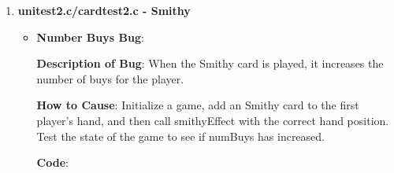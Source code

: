 \documentclass[11pt,letterpaper]{article}
\begin{document}
\begin{enumerate}[label=\Roman*.]
\begin{enumerate}
\begin{itemize}[leftmargin=*]
        \item \textbf{Discard Count Bug}:

          \textbf{Description of Bug}: The discard count increase does not match the number of 
          non-treasures drawn from deck. This bug is only detectable when (1) there are non-treasures
          in the deck before the second treasure and (2) there are at least two treasures in 
          the deck. 

        \textbf{How to Cause}: Initialize a game, add an adventurer card to the first player's hand, 
            add two treasures to the deck followed by two non-treasures. Check to see if discard pile has increased by 2.

        \textbf{Code}:
          \begin{lstlisting}

 ...<initialization same as above>... 
  if (testG.discardCount[player] == G.discardCount[player] + 2) {
    int first = testG.discard[player][testG.discardCount[player] - 1];
    int second = testG.discard[player][testG.discardCount[player] - 2];

    if ((first == duchy) && (second == province))
      printf("\tPASSED: Discarded cards match non-treasures drawn from deck\n");
    else
      printf("\t\u274CFAILED: Discarded cards do not match non-treasures drawn from deck\n");
  }
  else printf("\t\u274CFAILED: Discard should have increased by 2, but instead increased by %d\n", testG.discardCount[player] - G.discardCount[player]);
}
\end{lstlisting}

        \end{itemize}

      \item \textbf{unitest2.c/cardtest2.c - Smithy}

        \begin{itemize}[leftmargin=*]

        \item \textbf{Number Buys Bug}:

        \textbf{Description of Bug}: When the Smithy card is played, it increases
            the number of buys for the player.

        \textbf{How to Cause}: Initialize a game, add an Smithy card to 
          the first player's hand, and then call smithyEffect with the correct
          hand position. Test the state of the game to see if numBuys has increased.

        \textbf{Code}:


\end{itemize}
\end{enumerate}
\end{enumerate}
\end{document}
